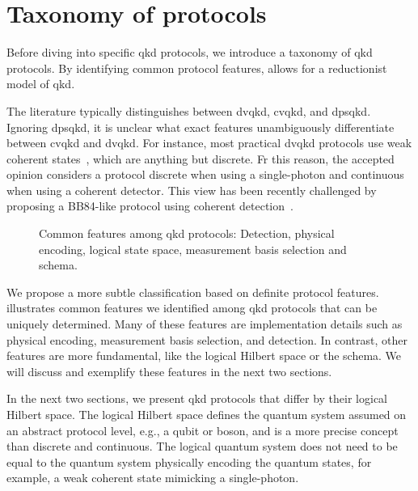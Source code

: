 \section{Taxonomy of protocols}

Before diving into specific \gls{qkd} protocols, we introduce a taxonomy of \gls{qkd} protocols.
By identifying common protocol features, allows for a reductionist model of \gls{qkd}.

The literature typically distinguishes between \gls{dvqkd}, \gls{cvqkd}, and \gls{dpsqkd}.
Ignoring \gls{dpsqkd}, it is unclear what exact features unambiguously differentiate between \gls{cvqkd} and \gls{dvqkd}.
For instance, most practical \gls{dvqkd} protocols use weak coherent states~\cite{Duvsek2006}, which are anything but discrete.
Fr this reason, the accepted opinion considers a protocol discrete when using a single-photon and continuous when using a coherent detector.
This view has been recently challenged by proposing a BB84-like protocol using coherent detection~\cite{Qi2021}.
\begin{figure}[htb]
	\centering
	
	\caption{Common features among \gls{qkd} protocols: Detection, physical encoding, logical state space, measurement basis selection and schema.}\label{fig:qkd_classification}
\end{figure}
We propose a more subtle classification based on definite protocol features.
 illustrates common features we identified among \gls{qkd} protocols that can be uniquely determined.
Many of these features are implementation details such as physical encoding, measurement basis selection, and detection.
In contrast, other features are more fundamental, like the logical Hilbert space or the schema.
We will discuss and exemplify these features in the next two sections.

In the next two sections, we present \gls{qkd} protocols that differ by their logical Hilbert space.
The logical Hilbert space defines the quantum system assumed on an abstract protocol level, e.g., a qubit or boson, and is a more precise concept than discrete and continuous.
The logical quantum system does not need to be equal to the quantum system physically encoding the quantum states, for example, a weak coherent state mimicking a single-photon.